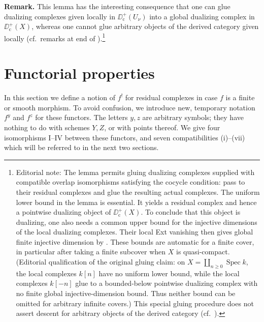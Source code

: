\par\medskip\noindent\textbf{Remark.}
This lemma has the interesting consequence that one can glue dualizing complexes given locally in $\DD_{\mathrm{c}}^{+}(U_{\nu})$ into a global dualizing complex in $\DD_{\mathrm{c}}^{+}(X)$, whereas one cannot glue arbitrary objects of the derived category given locally (cf.\ remarks at end of ).\footnote{Editorial note: The lemma permits gluing dualizing complexes supplied with compatible overlap isomorphisms satisfying the cocycle condition: pass to their residual complexes and glue the resulting actual complexes. The uniform lower bound in the lemma is essential. It yields a residual complex and hence a pointwise dualizing object of $\DD_{\mathrm{c}}^+(X)$. To conclude that this object is dualizing, one also needs a common upper bound for the injective dimensions of the local dualizing complexes. Their local Ext vanishing then gives global finite injective dimension by . These bounds are automatic for a finite cover, in particular after taking a finite subcover when $X$ is quasi-compact. (Editorial qualification of the original gluing claim: on $X=\coprod_{n\geq0}\operatorname{Spec}k$, the local complexes $k[n]$ have no uniform lower bound, while the local complexes $k[-n]$ glue to a bounded-below pointwise dualizing complex with no finite global injective-dimension bound. Thus neither bound can be omitted for arbitrary infinite covers.) This special gluing procedure does not assert descent for arbitrary objects of the derived category (cf.\ ).}
\par\medskip

\par\endgroup

\section{Functorial properties}\label{sec:6.2}
\begingroup
\setlength{\emergencystretch}{2em}

In this section we define a notion of $f^{!}$ for residual complexes in case $f$ is a finite or smooth morphism. To avoid confusion, we introduce new, temporary notation $f^{y}$ and $f^{z}$ for these functors. The letters $y,z$ are arbitrary symbols; they have nothing to do with schemes $Y,Z$, or with points thereof. We give four isomorphisms I--IV between these functors, and seven compatibilities (i)--(vii) which will be referred to in the next two sections.

